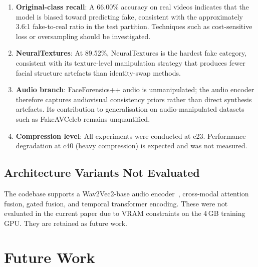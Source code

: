 \documentclass[conference]{IEEEtran}
\begin{document}
\begin{enumerate}
  \item \textbf{Original-class recall}: A 66.00\% accuracy on real videos indicates 
        that the model is biased toward predicting fake, consistent with the 
        approximately 3.6:1 fake-to-real ratio in the test partition. 
        Techniques such as cost-sensitive loss or oversampling should be 
        investigated.
  \item \textbf{NeuralTextures}: At 89.52\%, NeuralTextures is the hardest fake 
        category, consistent with its texture-level manipulation strategy that 
        produces fewer facial structure artefacts than identity-swap methods.
  \item \textbf{Audio branch}: FaceForensics++ audio is unmanipulated; the audio 
        encoder therefore captures audiovisual consistency priors rather than 
        direct synthesis artefacts. Its contribution to generalisation on 
        audio-manipulated datasets such as FakeAVCeleb remains unquantified.
  \item \textbf{Compression level}: All experiments were conducted at c23. 
        Performance degradation at c40 (heavy compression) is expected and 
        was not measured.
\end{enumerate}

\subsection{Architecture Variants Not Evaluated}
The codebase supports a Wav2Vec2-base audio encoder~\cite{baevski2020wav2vec2}, 
cross-modal attention fusion, gated fusion, and temporal transformer encoding. 
These were not evaluated in the current paper due to VRAM constraints on the 
4\,GB training GPU. They are retained as future work.

\section{Future Work}
\label{sec:future}
\end{document}
